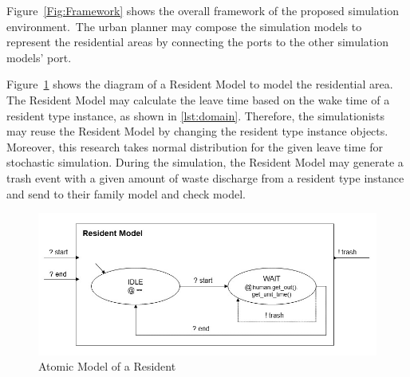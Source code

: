 \documentclass{scsSimAUDPaperFormat}
\begin{document}
Figure~\ref{Fig:Framework} shows the overall framework of the proposed simulation environment.~The urban planner may compose the simulation models to represent the residential areas by connecting the ports to the other simulation models' port.

Figure~\ref{Fig:residentmodel} shows the diagram of a Resident Model to model the residential area. The Resident Model may calculate the leave time based on the wake time of a resident type instance, as shown in \ref{lst:domain}. Therefore, the simulationists may reuse the Resident Model by changing the resident type instance objects. Moreover, this research takes normal distribution for the given leave time for stochastic simulation. During the simulation, the Resident Model may generate a trash event with a given amount of waste discharge from a resident type instance and send to their family model and check model. 

\begin{figure}[!ht]
    \centering
    \includegraphics[width=1.0\columnwidth]{fig/resident_model.jpg}
    \caption{Atomic Model of a Resident}
    \label{Fig:residentmodel}
\end{figure}



\end{document}
